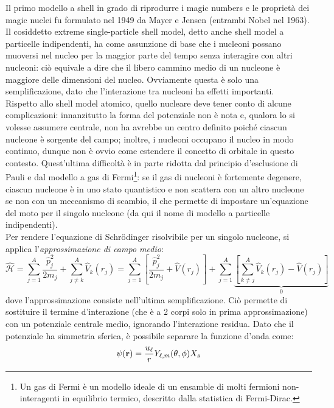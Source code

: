 Il primo modello a shell in grado di riprodurre i magic numbers e le proprietà dei magic nuclei fu formulato nel 1949 da Mayer e Jensen (entrambi Nobel nel 1963).\\
Il cosiddetto extreme single-particle shell model, detto anche shell model a particelle indipendenti, ha come assunzione di base che i nucleoni possano muoversi nel nucleo per la maggior parte del tempo senza interagire con altri nucleoni: ciò equivale a dire che il libero cammino medio di un nucleone è maggiore delle dimensioni del nucleo. Ovviamente questa è solo una semplificazione, dato che l'interazione tra nucleoni ha effetti importanti.\\
Rispetto allo shell model atomico, quello nucleare deve tener conto di alcune complicazioni: innanzitutto la forma del potenziale non è nota e, qualora lo si volesse assumere centrale, non ha avrebbe un centro definito poiché ciascun nucleone è sorgente del campo; inoltre, i nucleoni occupano il  nucleo in modo continuo, dunque non è ovvio come estendere il concetto di orbitale in questo contesto. Quest'ultima difficoltà è in parte ridotta dal principio d'esclusione di Pauli e dal modello a gas di Fermi\footnote{Un gas di Fermi è un modello ideale di un ensamble di molti fermioni non-interagenti in equilibrio termico, descritto dalla statistica di Fermi-Dirac.}: se il gas di nucleoni è fortemente degenere, ciascun nucleone è in uno stato quantistico e non scattera con un altro nucleone se non con un meccanismo di scambio, il che permette di impostare un'equazione del moto per il singolo nucleone (da qui il nome di modello a particelle indipendenti).\\
Per rendere l'equazione di Schrödinger risolvibile per un singolo nucleone, si applica l'\textit{approssimazione di campo medio}:
\begin{equation*}
	\hat{\mathcal{H}} = \sum_{j = 1}^{A} \frac{\hat{p}_j^2}{2m_j} + \sum_{j \neq k}^{A} \hat{V}_k(r_j) = \sum_{j = 1}^{A} \left[ \frac{\hat{p}_j^2}{2m_j} + \hat{V}(r_j) \right] + \sum_{j = 1}^{A} \underbrace{\left[ \sum_{k \neq j}^{A} \hat{V}_k(r_j) - \hat{V}(r_j) \right]}_{0}
\end{equation*}
dove l'approssimazione consiste nell'ultima semplificazione. Ciò permette di sostituire il termine d'interazione (che è a 2 corpi solo in prima approssimazione) con un potenziale centrale medio, ignorando l'interazione residua. Dato che il potenziale ha simmetria sferica, è possibile separare la funzione d'onda come:
\begin{equation}
	\psi(\mathbf{r}) = \frac{u_{\ell}}{r} Y_{\ell,m}(\theta,\phi) X_s
	\label{eq:5.3}
\end{equation}
